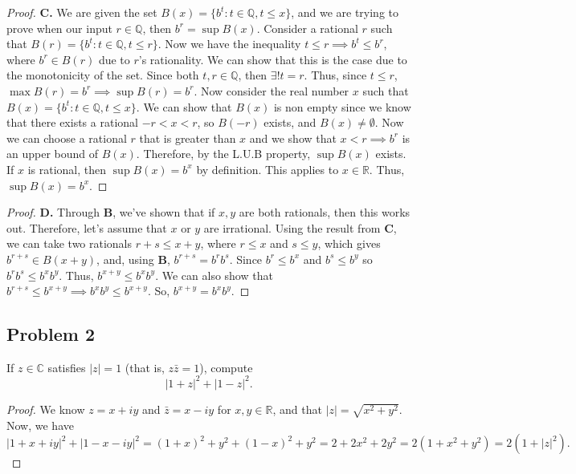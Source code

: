 \documentclass{amsart}
\begin{document}
\begin{proof}
    \textbf{C.} We are given the set $B(x) = \{ b^t : t \in \mathbb{Q}, t \leq x \}$, and we are trying to prove when our input $r \in \mathbb{Q}$, then $b^r = \sup B(x)$.
    Consider a rational $r$ such that $B(r) = \{b^t : t \in \mathbb{Q}, t \leq r\}$. Now we have the inequality $t \leq r \implies b^t \leq b^r$, where $b^r \in B(r)$ due to $r$'s rationality. We can show that this is the case due to the monotonicity of the set. Since both $t,r \in \mathbb{Q}$, then $\exists! t = r$. Thus, since $t \leq r$, $\max B(r) = b^r \implies \sup B(r) = b^r$. 
    Now consider the real number $x$ such that $B(x) = \{b^t : t \in \mathbb{Q}, t \leq x\}$. We can show that $B(x)$ is non empty since we know that there exists a rational $-r < x < r$, so $B(-r)$ exists, and $B(x) \neq \emptyset$. Now we can choose a rational $r$ that is greater than $x$ and we show that $x < r \implies b^r$ is an upper bound of $B(x)$. Therefore, by the L.U.B property, $\sup B(x)$ exists. If $x$ is rational, then $\sup B(x) = b^x$ by definition. This applies to $x \in \mathbb{R}$. Thus, $\sup B(x) = b^x$. 
\end{proof}
\begin{proof}
    \textbf{D.} Through \textbf{B}, we've shown that if $x,y$ are both rationals, then this works out. Therefore, let's assume that $x$ or $y$ are irrational. Using the result from \textbf{C}, we can take two rationals $r+s \leq x+y$, where $r \leq x$ and $s \leq y$, which gives $b^{r+s} \in B(x+y)$, and, using \textbf{B}, $b^{r+s}=b^rb^s$. Since $b^r \leq b^x$ and $b^s \leq b^y$ so $b^rb^s \leq b^xb^y$. Thus, $b^{x+y} \leq b^xb^y$. We can also show that $b^{r+s} \leq b^{x+y} \implies b^xb^y \leq b^{x+y}$. So, $b^{x+y} = b^xb^y$.
\end{proof}
\subsection*{Problem 2} If $z \in \mathbb{C}$ satisfies $|z| = 1$ (that is, $z \bar{z} = 1$), compute \[|1+z|^2 + |1-z|^2.\]
\begin{proof}
    We know $z = x + iy$ and $\bar{z} = x-iy$ for $x,y \in \mathbb{R}$, and that $|z| = \sqrt{x^2+y^2}$. Now, we have $|1+x+iy|^2 + |1-x-iy|^2 = (1+x)^2+y^2 + (1-x)^2 + y^2 = 2+2x^2+2y^2 = 2(1 + x^2+y^2) = 2(1 + |z|^2).$
\end{proof}
\end{document}

